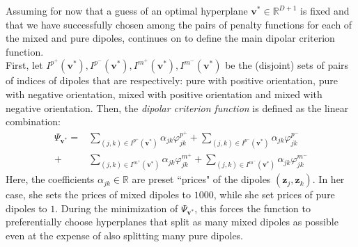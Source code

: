 \documentclass[12pt]{amsart}
\theoremstyle{definition}
\theoremstyle{plain}
\theoremstyle{remark}
\newcommand{\RR}{\mathbb{R}}
\begin{document}
Assuming for now that a guess of an optimal hyperplane $\mathbf{v}^\ast \in \RR^{D + 1}$ is fixed and that we have successfully chosen among the pairs of penalty functions for each of the mixed and pure dipoles, \cite{kretowska} continues on to define the main dipolar criterion function. \\

First, let $I^{p^+}(\mathbf{v}^\ast), I^{p^-}(\mathbf{v}^\ast), I^{m^+}(\mathbf{v}^\ast), I^{m^-}(\mathbf{v}^\ast)$ be the (disjoint) sets of pairs of indices of dipoles that are respectively: pure with positive orientation, pure with negative orientation, mixed with positive orientation and mixed with negative orientation. Then, the  \emph{dipolar criterion function} is defined as the linear combination:
\begin{align*}
	\Psi_{\mathbf{v}^\ast} = &\sum_{(j, k) \in I^{p^+}(\mathbf{v}^\ast)} \alpha_{jk} \varphi^{p^+}_{jk} + \sum_{(j, k) \in I^{p^-}(\mathbf{v}^\ast)} \alpha_{jk} \varphi^{p^-}_{jk} \\ 
	+ &\sum_{(j, k) \in I^{m^+}(\mathbf{v}^\ast)} \alpha_{jk} \varphi^{m^+}_{jk} + \sum_{(j, k) \in I^{m^-}(\mathbf{v}^\ast)} \alpha_{jk} \varphi^{m^-}_{jk}
\end{align*} Here, the coefficients $\alpha_{jk} \in \RR$ are preset ``prices" \cite{kretowska} of the dipoles $(\mathbf{z}_j, \mathbf{z}_k)$. In her case, she sets the prices of mixed dipoles to $1000$, while she set prices of pure dipoles to $1$. During the minimization of $\Psi_{\mathbf{v}^\ast}$, this forces the function to preferentially choose hyperplanes that split as many mixed dipoles as possible even at the expense of also splitting many pure  dipoles.







\end{document}

